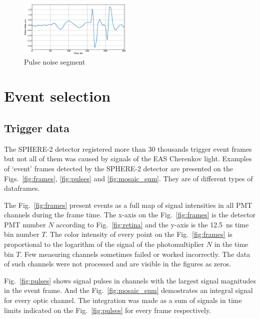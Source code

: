 \documentclass[final,5p,times,twocolumn]{elsarticle}
\begin{document}
\begin{figure}[tb]
\includegraphics[width=0.48\textwidth]{figs/pulse_noise_segment.eps}
\caption{Pulse noise segment}
\label{fig:pulse_noise_segment}
\end{figure}

\section{Event selection\label{sect:classification}}

\subsection{Trigger data}

The SPHERE-2 detector registered more than 30 thousands trigger event frames but not all of them was caused by signals of the EAS Cherenkov light. 
Examples of `event' frames detected by the SPHERE-2 detector are presented on the Figs.~\ref{fig:frames}, \ref{fig:pulses} and \ref{fig:mosaic_sum}. They are of different types of  dataframes. 

The Fig.~\ref{fig:frames} present events as a full map of signal intensities in all PMT channels during the frame time. The x-axis on the Fig.~\ref{fig:frames} is the detector PMT number $N$ according to Fig.~\ref{fig:retina} and the y-axis is the 12.5~ns time bin number $T$. The color intensity of every point on the Fig.~\ref{fig:frames} is proportional to the logarithm of the signal of the  photomultiplier $N$ in the time bin $T$. Few measuring channels sometimes failed or worked incorrectly. The data of such channels were not processed and are visible in the figures as zeros.

Fig.~\ref{fig:pulses} shows signal pulses in channels with the largest signal magnitudes in the event frame. And the Fig.~\ref{fig:mosaic_sum} demostrates an integral signal for every optic channel. The integration was made as a sum of signals in time limits indicated on the Fig.~\ref{fig:pulses} for every frame respectively. 
\end{document}
